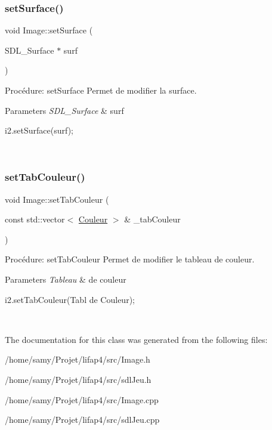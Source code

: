 \subsubsection{\texorpdfstring{set\+Surface()}{setSurface()}}
{\footnotesize\ttfamily void Image\+::set\+Surface (\begin{DoxyParamCaption}\item[{S\+D\+L\+\_\+\+Surface $\ast$}]{surf }\end{DoxyParamCaption})}



Procédure\+: set\+Surface Permet de modifier la surface. 


\begin{DoxyParams}{Parameters}
{\em S\+D\+L\+\_\+\+Surface} & surf 
\begin{DoxyCode}
i2.setSurface(surf);
\end{DoxyCode}
 \\
\hline
\end{DoxyParams}
\mbox{\label{classImage_a17feecebcbde65970ffa419ba9f0465a}} 
\subsubsection{\texorpdfstring{set\+Tab\+Couleur()}{setTabCouleur()}}
{\footnotesize\ttfamily void Image\+::set\+Tab\+Couleur (\begin{DoxyParamCaption}\item[{const std\+::vector$<$ \hyperlink{classCouleur}{Couleur} $>$ \&}]{\+\_\+tab\+Couleur }\end{DoxyParamCaption})}



Procédure\+: set\+Tab\+Couleur Permet de modifier le tableau de couleur. 


\begin{DoxyParams}{Parameters}
{\em Tableau} & de couleur 
\begin{DoxyCode}
i2.setTabCouleur(Tabl de Couleur);
\end{DoxyCode}
 \\
\hline
\end{DoxyParams}


The documentation for this class was generated from the following files\+:\begin{DoxyCompactItemize}
\item 
/home/samy/\+Projet/lifap4/src/Image.\+h\item 
/home/samy/\+Projet/lifap4/src/sdl\+Jeu.\+h\item 
/home/samy/\+Projet/lifap4/src/Image.\+cpp\item 
/home/samy/\+Projet/lifap4/src/sdl\+Jeu.\+cpp\end{DoxyCompactItemize}
